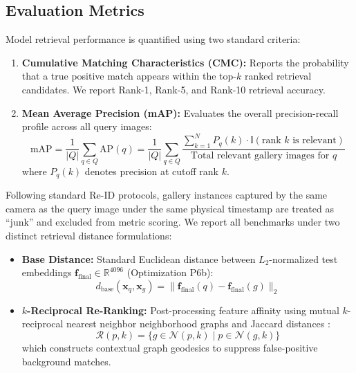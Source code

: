 \subsection{Evaluation Metrics}

Model retrieval performance is quantified using two standard criteria:
\begin{enumerate}
    \item \textbf{Cumulative Matching Characteristics (CMC):} Reports the probability that a true positive match appears within the top-$k$ ranked retrieval candidates. We report Rank-1, Rank-5, and Rank-10 retrieval accuracy.
    \item \textbf{Mean Average Precision (mAP):} Evaluates the overall precision-recall profile across all query images:
    \begin{equation}
        \text{mAP} = \frac{1}{|Q|} \sum_{q \in Q} \text{AP}(q) = \frac{1}{|Q|} \sum_{q \in Q} \frac{\sum_{k=1}^N P_q(k) \cdot \mathbb{I}(\text{rank } k \text{ is relevant})}{\text{Total relevant gallery images for } q}
    \end{equation}
    where $P_q(k)$ denotes precision at cutoff rank $k$.
\end{enumerate}

Following standard Re-ID protocols, gallery instances captured by the same camera as the query image under the same physical timestamp are treated as ``junk'' and excluded from metric scoring. We report all benchmarks under two distinct retrieval distance formulations:
\begin{itemize}
    \item \textbf{Base Distance:} Standard Euclidean distance between $L_2$-normalized test embeddings $\mathbf{f}_{\text{final}} \in \mathbb{R}^{4096}$ (Optimization P6b):
    \begin{equation}
        d_{\text{base}}(\mathbf{x}_q, \mathbf{x}_g) = \|\mathbf{f}_{\text{final}}(q) - \mathbf{f}_{\text{final}}(g)\|_2
    \end{equation}
    \item \textbf{$k$-Reciprocal Re-Ranking:} Post-processing feature affinity using mutual $k$-reciprocal nearest neighbor neighborhood graphs and Jaccard distances \cite{zhong2017reranking}:
    \begin{equation}
        \mathcal{R}(p, k) = \{g \in \mathcal{N}(p, k) \mid p \in \mathcal{N}(g, k)\}
    \end{equation}
    which constructs contextual graph geodesics to suppress false-positive background matches.
\end{itemize}

